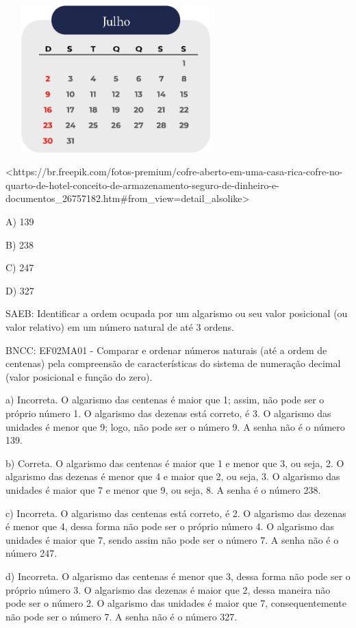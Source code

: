 \begin{escolha}
\begin{escolha}
{{{{\includegraphics[width=3.35417in,height=2.23611in]{media/image130.png}

\textless{}https://br.freepik.com/fotos-premium/cofre-aberto-em-uma-casa-rica-cofre-no-quarto-de-hotel-conceito-de-armazenamento-seguro-de-dinheiro-e-documentos\_26757182.htm\#from\_view=detail\_alsolike\textgreater{}

A) 139

B) 238

C) 247

D) 327

SAEB: Identificar a ordem ocupada por um algarismo ou seu valor
posicional (ou valor relativo) em um número natural de até 3 ordens.

BNCC: EF02MA01 - Comparar e ordenar números naturais (até a ordem de
centenas) pela compreensão de características do sistema de numeração
decimal (valor posicional e função do zero).

a) Incorreta. O algarismo das centenas é maior que 1; assim, não
pode ser o próprio número 1. O algarismo das dezenas está correto, é 3.
O algarismo das unidades é menor que 9; logo, não pode ser o número 9. A senha não é o número 139.

b) Correta. O algarismo das centenas é maior que 1 e menor que 3, ou
seja, 2. O algarismo das dezenas é menor que 4 e maior que 2, ou seja,
3. O algarismo das unidades é maior que 7 e menor que 9, ou seja, 8. A
senha é o número 238.

c) Incorreta. O algarismo das centenas está correto, é 2. O algarismo
das dezenas é menor que 4, dessa forma não pode ser o próprio número 4.
O algarismo das unidades é maior que 7, sendo assim não pode ser o
número 7. A senha não é o número 247.

d) Incorreta. O algarismo das centenas é menor que 3, dessa forma não
pode ser o próprio número 3. O algarismo das dezenas é maior que 2,
dessa maneira não pode ser o número 2. O algarismo das unidades é maior
que 7, consequentemente não pode ser o número 7. A senha não é o número
327.

}}}}
\end{escolha}
\end{escolha}

